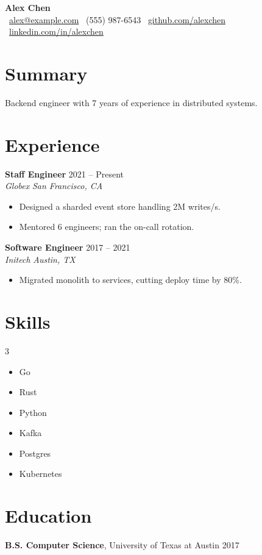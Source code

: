 \documentclass[10pt]{article}
\newcommand{\job}[4]{\textbf{#1} \hfill #2 \\ \textit{#3} \hfill \textit{#4}}
\begin{document}
\begin{center}
{\LARGE \textbf{Alex Chen}} \\[4pt]
\faEnvelope\ \href{mailto:alex@example.com}{alex@example.com} \quad
\faPhone\ (555) 987-6543 \quad
\faGithub\ \href{https://github.com/alexchen}{github.com/alexchen} \quad
\faLinkedin\ \url{linkedin.com/in/alexchen}
\end{center}

\section{Summary}
Backend engineer with 7 years of experience in distributed systems.

\section{Experience}
\job{Staff Engineer}{2021 -- Present}{Globex}{San Francisco, CA}
\begin{itemize}[label=\textbullet]
  \item Designed a sharded event store handling 2M writes/s.
  \item Mentored 6 engineers; ran the on-call rotation.
\end{itemize}

\job{Software Engineer}{2017 -- 2021}{Initech}{Austin, TX}
\begin{itemize}[leftmargin=1.5em, itemsep=1pt]
  \item Migrated monolith to services, cutting deploy time by 80\%.
\end{itemize}

\section{Skills}
\begin{multicols}{3}
\begin{itemize}[nosep]
\item Go \item Rust \item Python \item Kafka \item Postgres \item Kubernetes
\end{itemize}
\end{multicols}

\section{Education}
\textbf{B.S. Computer Science}, University of Texas at Austin \hfill 2017
\end{document}
